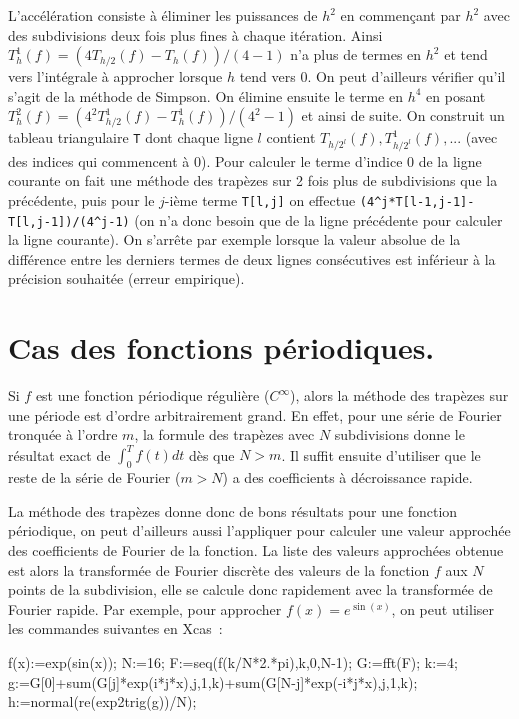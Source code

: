 \documentclass[a4paper,11pt]{book}
\begin{document}
\begin{giacjshere}
L'accélération consiste à éliminer les puissances de $h^2$ en
commençant par $h^2$ avec des subdivisions deux fois plus fines
à chaque itération.
Ainsi $T_h^1(f) = (4T_{h/2}(f)-T_h(f))/(4-1)$ n'a plus de termes en $h^2$
et tend vers l'intégrale à approcher lorsque $h$ tend vers 0. 
On peut d'ailleurs vérifier qu'il s'agit de la méthode de Simpson.
On élimine ensuite le terme en $h^4$ en posant
$T_h^2(f)=(4^2 T_{h/2}^1(f)-T_h^1(f))/(4^2-1)$ et ainsi
de suite. On construit un tableau triangulaire \verb|T|
dont chaque
ligne $l$ contient $T_{h/2^l}(f), T_{h/2^l}^1(f), ...$ 
(avec des indices qui commencent à 0). Pour
calculer le terme d'indice 0 de la ligne courante
on fait une méthode des trapèzes sur 2 fois plus
de subdivisions que la précédente, puis pour le $j$-ième terme
\verb|T[l,j]|
on effectue \verb|(4^j*T[l-1,j-1]-T[l,j-1])/(4^j-1)|
(on n'a donc besoin que de la ligne précédente pour calculer
la ligne courante).
On s'arrête par exemple lorsque la valeur absolue de la différence
entre les derniers termes de deux lignes consécutives est inférieur
à la précision souhaitée (erreur empirique).


\section{Cas des fonctions p\'eriodiques.}
Si $f$ est une fonction p\'eriodique r\'eguli\`ere ($C^\infty$),
alors la m\'ethode des trap\`ezes sur une p\'eriode est d'ordre 
arbitrairement grand. En effet, pour une s\'erie de Fourier tronqu\'ee
\`a l'ordre $m$, la formule des trap\`ezes avec $N$ subdivisions donne
le r\'esultat exact de $\int_0^T f(t) dt$ d\`es que $N>m$. Il suffit
ensuite d'utiliser que le reste de
la s\'erie de Fourier ($m>N$) 
a des coefficients \`a d\'ecroissance rapide.

La m\'ethode des trap\`ezes donne donc de bons r\'esultats pour une 
fonction p\'eriodique, on peut d'ailleurs aussi 
l'appliquer pour calculer une valeur
approch\'ee des coefficients de Fourier de la fonction. La liste des valeurs
approch\'ees obtenue est alors la transform\'ee de Fourier discr\`ete
des valeurs de la fonction $f$ aux $N$ points de la subdivision, elle
se calcule donc rapidement avec la transform\'ee de Fourier rapide.
Par exemple, pour approcher $f(x)=e^{\sin(x)}$, on peut utiliser les
commandes suivantes en Xcas~:
\begin{giacprog}
f(x):=exp(sin(x));
N:=16; F:=seq(f(k/N*2.*pi),k,0,N-1); G:=fft(F);
k:=4;
g:=G[0]+sum(G[j]*exp(i*j*x),j,1,k)+sum(G[N-j]*exp(-i*j*x),j,1,k);
h:=normal(re(exp2trig(g))/N);
\end{giacprog}


\end{giacjshere}
\end{document}
